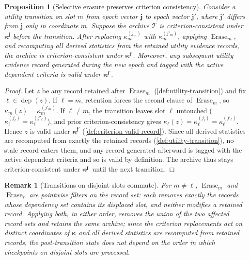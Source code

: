 \documentclass{paper}
\newtheorem{proposition}{Proposition}
\newtheorem{remark}{Remark}
\begin{document}
\begin{proposition}[Selective erasure preserves criterion consistency]
\label{prop:erasure-stationarity}
Consider a utility transition on slot \(m\) from epoch vector \(\boldsymbol{j}\) to epoch vector
\(\boldsymbol{j}'\), where \(\boldsymbol{j}'\) differs from \(\boldsymbol{j}\) only in coordinate \(m\). Suppose the
archive \(\mathcal T\) is criterion-consistent under
\(\boldsymbol{\kappa}^{\boldsymbol{j}}\) before the transition. After replacing
\(\kappa_m^{(j_m)}\) with \(\kappa_m^{(j'_m)}\), applying \(\operatorname{Erase}_m\), and recomputing all
derived statistics from the retained utility evidence records, the archive is criterion-consistent under
\(\boldsymbol{\kappa}^{\boldsymbol{j}'}\). Moreover, any subsequent utility evidence record generated during
the new epoch and tagged with the active dependent criteria is valid under
\(\boldsymbol{\kappa}^{\boldsymbol{j}'}\).
\end{proposition}

\begin{proof}
Let \(z\) be any record retained after \(\operatorname{Erase}_m\) (\cref{def:utility-transition}) and fix
\(\ell\in\operatorname{dep}(z)\). If \(\ell=m\), retention forces the second clause of
\(\operatorname{Erase}_m\), so \(\kappa_m(z)=\kappa_m^{(j'_m)}\). If \(\ell\neq m\), the transition leaves
slot \(\ell\) untouched (\(\kappa_\ell^{(j_\ell)}=\kappa_\ell^{(j'_\ell)}\)), and prior
criterion-consistency gives \(\kappa_\ell(z)=\kappa_\ell^{(j_\ell)}=\kappa_\ell^{(j'_\ell)}\). Hence
\(z\) is valid under \(\boldsymbol{\kappa}^{\boldsymbol{j}'}\) (\cref{def:criterion-valid-record}). Since
all derived statistics are recomputed from exactly the retained records (\cref{def:utility-transition}),
no stale record enters them, and any record generated afterward is tagged with the active dependent
criteria and so is valid by definition. The archive thus stays criterion-consistent under
\(\boldsymbol{\kappa}^{\boldsymbol{j}'}\) until the next transition.
\end{proof}

\begin{remark}[Transitions on disjoint slots commute]
\label{rem:erasure-commute}
For \(m\neq \ell\), \(\operatorname{Erase}_m\) and \(\operatorname{Erase}_\ell\) are pointwise filters on the record set: each removes exactly the records whose dependency set contains its displaced slot, and neither modifies a retained record. Applying both, in either order, removes the union of the two affected record sets and retains the same archive; since the criterion replacements act on distinct coordinates of \(\boldsymbol{\kappa}\) and all derived statistics are recomputed from retained records, the post-transition state does not depend on the order in which checkpoints on disjoint slots are processed.
\end{remark}
\end{document}

